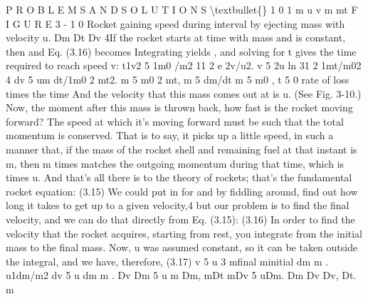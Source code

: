 \documentclass[10pt,oneside]{article}
\begin{document}
P R O B L E M S  A N D  S O L U T I O N S \textbackslash{}textbullet\{\} 1 0 1 m u v m  mt F I G U R E  3 - 1 0 Rocket gaining speed during interval by ejecting mass with velocity u. Dm Dt Dv 4If the rocket starts at time with mass and is constant, then and Eq. (3.16) becomes Integrating yields , and solving for t gives the time required to reach speed v: t1v2 5 1m0 /m2 11 2 e 2v/u2. v 5 2u ln 31 2 1mt/m02 4 dv 5 um dt/1m0 2 mt2. m 5 m0 2 mt, m 5 dm/dt m 5 m0 , t 5 0 rate of loss times the time And the velocity that this mass comes out at is u. (See Fig. 3-10.) Now, the moment after this mass is thrown back, how fast is the rocket moving forward? The speed at which it’s moving forward must be such that the total momentum is conserved. That is to say, it picks up a little speed, in such a manner that, if the mass of the rocket shell and remaining fuel at that instant is m, then m times matches the outgoing momentum during that time, which is times u. And that’s all there is to the theory of rockets; that’s the fundamental rocket equation: (3.15) We could put in for and by fiddling around, find out how long it takes to get up to a given velocity,4 but our problem is to find the final velocity, and we can do that directly from Eq. (3.15): (3.16) In order to find the velocity that the rocket acquires, starting from rest, you integrate from the initial mass to the final mass. Now, u was assumed constant, so it can be taken outside the integral, and we have, therefore, (3.17) v 5 u 3 mfinal minitial dm m . u1dm/m2 dv 5 u dm m . Dv Dm 5 u m Dm, mDt mDv 5 uDm. Dm Dv Dv, Dt. m\par
\end{document}
